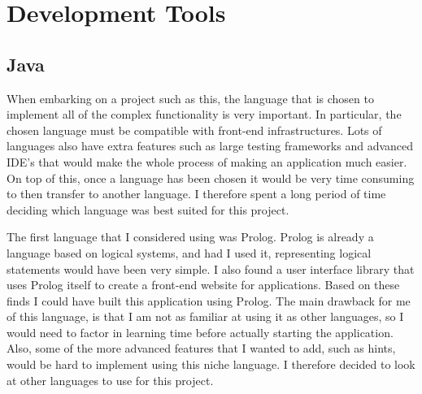 \pagebreak

\section{Development Tools \label{devTools}}

\subsection{Java}

When embarking on a project such as this, the language that is chosen to implement all of the complex functionality is very important. In particular, the chosen language must be compatible with front-end infrastructures. Lots of languages also have extra features such as large testing frameworks and advanced IDE's that would make the whole process of making an application much easier. On top of this, once a language has been chosen it would be very time consuming to then transfer to another language. I therefore spent a long period of time deciding which language was best suited for this project.

The first language that I considered using was Prolog. Prolog is already a language based on logical systems, and had I used it, representing logical statements would have been very simple. I also found a user interface library that uses Prolog itself to create a front-end website for applications. Based on these finds I could have built this application using Prolog. The main drawback for me of this language, is that I am not as familiar at using it as other languages, so I would need to factor in learning time before actually starting the application. Also, some of the more advanced features that I wanted to add, such as hints, would be hard to implement using this niche language. I therefore decided to look at other languages to use for this project. 

